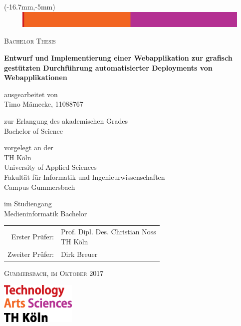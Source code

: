 \begin{titlepage}
  \enlargethispage{5cm}

  \begin{textblock*}{230mm}(-16.7mm,-5mm)
    \includegraphics[width=230mm,height=8mm]{./assets/topline.eps}
  \end{textblock*}


  \begin{center}
    \textsc{\Large{Bachelor Thesis}}

    \vspace{1cm}

    \LARGE{\textbf{Entwurf und Implementierung einer Webapplikation zur grafisch gestützten Durchführung automatisierter Deployments von Webapplikationen}}

    \vspace{1cm}

    \normalsize{ausgearbeitet von} \\
    \Large{Timo Mämecke, 11088767}

    \normalsize{zur Erlangung des akademischen Grades} \\
    \Large{Bachelor of Science}

    \normalsize{vorgelegt an der} \\
    \Large{TH Köln}\\
    \Large{University of Applied Sciences}\\
    \Large{Fakultät für Informatik und Ingenieurwissenschaften}\\
    \Large{Campus Gummersbach}

    \normalsize{im Studiengang} \\
    \Large{Medieninformatik Bachelor}

    \vspace{1cm}

    \large{
      \begin{tabular}{ r l }
        Erster Prüfer: & \makecell[lt]{Prof. Dipl. Des. Christian Noss\\\small{TH Köln}\vspace{0.2cm}} \\
        Zweiter Prüfer: & Dirk Breuer
      \end{tabular}
    }

    \vspace{1cm}

    \textsc{Gummersbach, im Oktober 2017}

  \end{center}

  \vspace{\fill}

  \begin{flushright}
    \includegraphics[height=55pt]{./assets/logo_th-koeln.eps}
  \end{flushright}
\end{titlepage}
